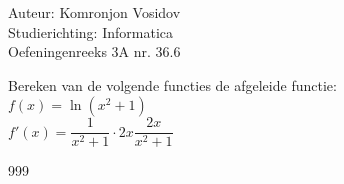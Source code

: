 \documentclass[a4paper]{article}
\begin{document}
	
	\noindent \large Auteur: Komronjon Vosidov \\
	\noindent \large Studierichting: Informatica\\
	\noindent \large Oefeningenreeks 3A nr. 36.6\\
	
	\medskip
	
	\normalsize
	Bereken van de volgende functies de afgeleide functie:\\
	
	$f(x) = \ln(x^2 + 1)$ \\
	
	$f'(x) = \dfrac{1}{x^2 + 1} \cdot 2x \dfrac{2x}{x^2 + 1}$\\
	
	
\begin{thebibliography}{999}
\end{thebibliography}		
\end{document}
